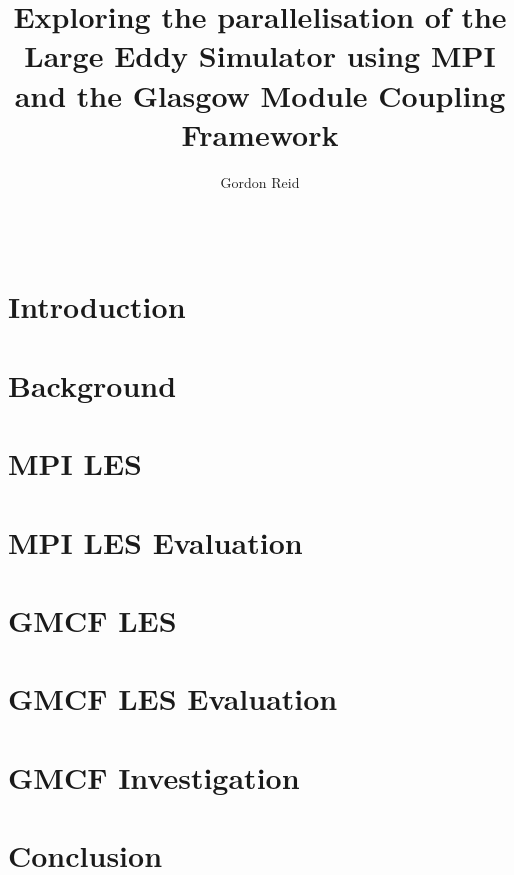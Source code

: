 \documentclass{acm_proc_article-sp}
\title{Exploring the parallelisation of the Large Eddy Simulator using MPI and
the Glasgow Module Coupling Framework}
\author{
    \alignauthor
    Gordon Reid\\
    \affaddr{School of Computing Science}\\
    \affaddr{University of Glasgow}\\
    \email{1002536r@student.gla.ac.uk}
}
\begin{document}
\maketitle

\begin{abstract}

\end{abstract}

\section{Introduction}


\section{Background}
\label{sec:Background}

\section{MPI LES}
\label{sec:MPILES}

\section{MPI LES Evaluation}
\label{sec:MPILESEval}

\section{GMCF LES}
\label{sec:GMCFLES}

\section{GMCF LES Evaluation}
\label{sec:GMCFLESEval}

\section{GMCF Investigation}
\label{sec:GMCFInvestigation}

\section{Conclusion}
\label{sec:Conclusion}



\end{document}
